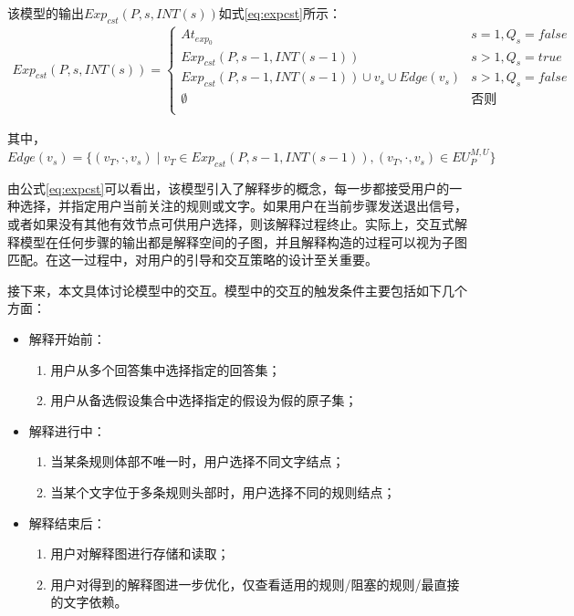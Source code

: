\begin{definition}[可交互解释模型]
    该模型的输出$Exp_{cst}(P, s, INT(s))$如式\eqref{eq:expcst}所示：
    \begin{align}
        \label{eq:expcst}
        Exp_{cst}(P, s, INT(s))=
        \begin{cases}
        At_{exp_0} &s = 1, Q_s = false\\
        Exp_{cst}(P, s-1, INT(s-1)) &s > 1, Q_s = true\\
        Exp_{cst}(P, s-1, INT(s-1)) \cup v_s \cup Edge(v_s) & s > 1, Q_s = false\\
        \emptyset &\text{否则}\\
      \end{cases}
    \end{align}
    
    其中，$Edge(v_s)=\{(v_T, \cdotp, v_s) \mid v_T \in Exp_{cst}(P, s-1, INT(s-1)), (v_T, \cdotp, v_s) \in EU_{P}^{M,U}\}$
\end{definition}

由公式\eqref{eq:expcst}可以看出，该模型引入了解释步的概念，每一步都接受用户的一种选择，并指定用户当前关注的规则或文字。如果用户在当前步骤发送退出信号，或者如果没有其他有效节点可供用户选择，则该解释过程终止。实际上，交互式解释模型在任何步骤的输出都是解释空间的子图，并且解释构造的过程可以视为子图匹配。在这一过程中，对用户的引导和交互策略的设计至关重要。

接下来，本文具体讨论模型中的交互。模型中的交互的触发条件主要包括如下几个方面：
\begin{itemize}[topsep = 0pt]
    \item 解释开始前：
        \begin{enumerate}[label=(\arabic*), topsep = 0pt]
            \setlength\itemsep{-0.3em}
            \item 用户从多个回答集中选择指定的回答集；
            \item 用户从备选假设集合中选择指定的假设为假的原子集；
        \end{enumerate}
    \item 解释进行中：
       \begin{enumerate}[label=(\arabic*), topsep = 0pt]
            \setlength\itemsep{-0.3em}
            \item 当某条规则体部不唯一时，用户选择不同文字结点；
            \item 当某个文字位于多条规则头部时，用户选择不同的规则结点；
        \end{enumerate}
    \item 解释结束后：
        \begin{enumerate}[label=(\arabic*), topsep = 0pt]
            \setlength\itemsep{-0.3em}
            \item 用户对解释图进行存储和读取；
            \item 用户对得到的解释图进一步优化，仅查看适用的规则/阻塞的规则/最直接的文字依赖。
        \end{enumerate}
\end{itemize}

